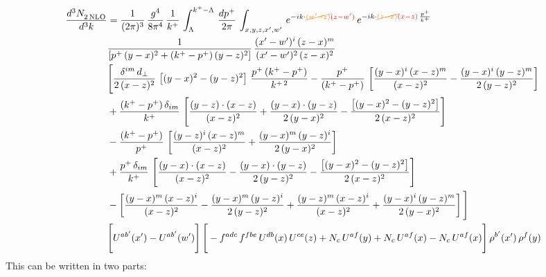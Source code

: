 \documentclass[9pt]{article}
\numberwithin{equation}{section}
\begin{document}
\begin{align}
    \frac{d^{3}N_{2\,\rm NLO}^{\rm}}{d^{3}k}  & =  \frac{1}{(2\pi)^{3}}\, \frac{g^{4}}{8\pi^{4}}\,\frac{1}{k^{+}}\,\int_{\Lambda}^{k^{+}-\Lambda}\, \frac{dp^{+}}{2\pi} \, \int_{x,y,z,x',w'}\,e^{-ik\cdot{\color{orange}\cancel{(w'-z)}}{\color{red}(z-w')}}\,e^{-ik\cdot {\color{orange}\cancel{(z-x)}}{\color{red}(x-z)}\,\frac{p^{+}}{k^{+}}}\,\notag \\ & \frac{1}{\left[p^{+}\,(y-x)^{2}+(k^{+}-p^{+})\,(y-z)^{2}\right]}\, \frac{(x'-w')^{i}\,(z-x)^{m}}{(x'-w')^{2}\,(z-x)^{2}} \notag \\ & \Bigg[\frac{\delta^{im}\,d_{\perp}}{2\,(x-z)^{2}}\,\left[(y-x)^{2}-(y-z)^{2}\right]\,\frac{p^{+}\,(k^{+}-p^{+})}{k^{+\,2}}-\frac{p^{+}}{(k^{+}-p^{+})}\,\left[\frac{(y-x)^{i}\,(x-z)^{m}}{(x-z)^{2}}-\frac{(y-x)^{i}\,(y-z)^{m}}{2\,(y-z)^{2}}\right]\notag \\ & +\frac{(k^{+}-p^{+})\,\delta_{im}}{k^{+}}\,\left[\frac{(y-z)\cdot (x-z)}{(x-z)^{2}}+\frac{(y-x)\cdot (y-z)}{2\,(y-x)^{2}}-\frac{\left[(y-x)^{2}-(y-z)^{2}\right]}{2\,(x-z)^{2}}\right]\notag \\ & -\frac{(k^{+}-p^{+})}{p^{+}}\,\left[\frac{(y-z)^{i}\,(x-z)^{m}}{(x-z)^{2}}+\frac{(y-x)^{m}\,(y-z)^{i}}{2\,(y-x)^{2}}\right]\notag \\ & +\frac{p^{+}\,\delta_{im}}{k^{+}}\,\left[\frac{(y-x)\cdot (x-z)}{(x-z)^{2}}-\frac{(y-x)\cdot (y-z)}{2\,(y-z)^{2}}-\frac{\left[(y-x)^{2}-(y-z)^{2}\right]}{2\,(x-z)^{2}}\right]\notag \\ &-\left[\frac{(y-x)^{m}\,(x-z)^{i}}{(x-z)^{2}}-\frac{(y-x)^{m}\,(y-z)^{i}}{2\,(y-z)^{2}}+\frac{(y-z)^{m}\,(x-z)^{i}}{(x-z)^{2}}+\frac{(y-x)^{i}\,(y-z)^{m}}{2\,(y-x)^{2}}\right]\Bigg]\notag \\ & \Bigg[U^{ab'}(x')-U^{ab'}(w')\Bigg]\,\Bigg[-f^{adc}\,f^{fbe}\,U^{db}(x)\,U^{ce}(z)+N_{c}\,U^{af}(y)+N_{c}\,U^{af}(x) -N_{c}\,U^{af}(x)\Bigg]\,\rho^{b'}(x')\,\rho^{f}(y)
\end{align}
This can be written in two parts: 
\end{document}
